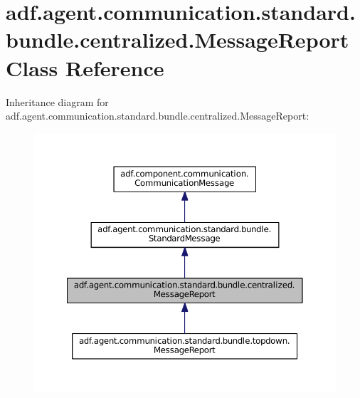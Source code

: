 \hypertarget{classadf_1_1agent_1_1communication_1_1standard_1_1bundle_1_1centralized_1_1MessageReport}{}\section{adf.\+agent.\+communication.\+standard.\+bundle.\+centralized.\+Message\+Report Class Reference}
\label{classadf_1_1agent_1_1communication_1_1standard_1_1bundle_1_1centralized_1_1MessageReport}


Inheritance diagram for adf.\+agent.\+communication.\+standard.\+bundle.\+centralized.\+Message\+Report\+:
\nopagebreak
\begin{figure}[H]
\begin{center}
\leavevmode
\includegraphics[width=350pt]{classadf_1_1agent_1_1communication_1_1standard_1_1bundle_1_1centralized_1_1MessageReport__inherit__graph}
\end{center}
\end{figure}


